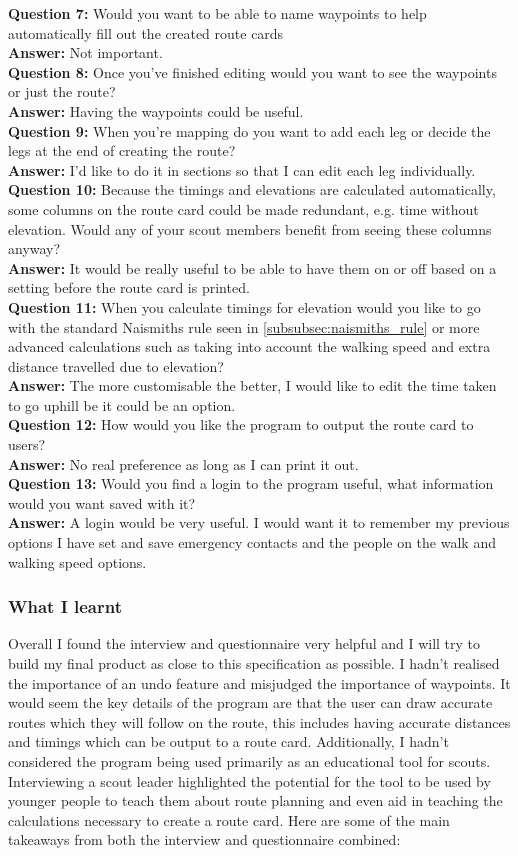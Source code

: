 \documentclass{article}
\newcommand{\InterviewQuestion}[3]{
    \noindent \textbf{Question #1: } #2 \\
    \noindent \textbf{Answer: } #3 \\
}
\begin{document}
            \InterviewQuestion{7}{Would you want to be able to name waypoints to help automatically fill out the created route cards}{Not important.}

            \InterviewQuestion{8}{Once you've finished editing would you want to see the waypoints or just the route?}{Having the waypoints could be useful.}

            \InterviewQuestion{9}{When you're mapping do you want to add each leg or decide the legs at the end of creating the route?}{I'd like to do it in sections so that I can edit each leg individually.}

            \InterviewQuestion{10}{Because the timings and elevations are calculated automatically, some columns on the route card could be made redundant, e.g. time without elevation. Would any of your scout members benefit from seeing these columns anyway?}{It would be really useful to be able to have them on or off based on a setting before the route card is printed.}

            \InterviewQuestion{11}{When you calculate timings for elevation would you like to go with the standard Naismiths rule seen in \cref{subsubsec:naismiths_rule} or more advanced calculations such as taking into account the walking speed and extra distance travelled due to elevation?}{The more customisable the better, I would like to edit the time taken to go uphill be it could be an option.}

            \InterviewQuestion{12}{How would you like the program to output the route card to users?}{No real preference as long as I can print it out.}

            \InterviewQuestion{13}{Would you find a login to the program useful, what information would you want saved with it?}{A login would be very useful. I would want it to remember my previous options I have set and save emergency contacts and the people on the walk and walking speed options.}

        \subsubsection{What I learnt}
        
            Overall I found the interview and questionnaire very helpful and I will try to build my final product as close to this specification as possible. I hadn't realised the importance of an undo feature and misjudged the importance of waypoints. It would seem the key details of the program are that the user can draw accurate routes which they will follow on the route, this includes having accurate distances and timings which can be output to a route card. Additionally, I hadn't considered the program being used primarily as an educational tool for scouts. Interviewing a scout leader highlighted the potential for the tool to be used by younger people to teach them about route planning and even aid in teaching the calculations necessary to create a route card. Here are some of the main takeaways from both the interview and questionnaire combined:
\end{document}
